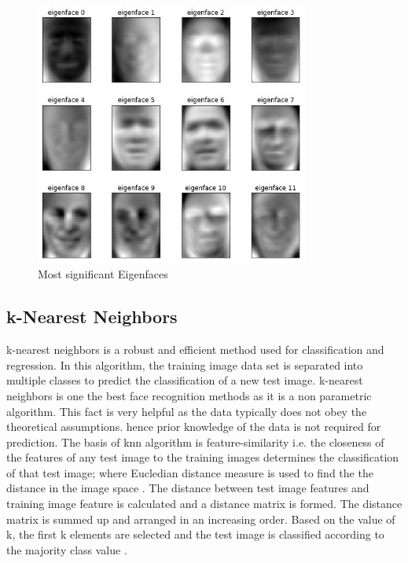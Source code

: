 \documentclass[conference]{IEEEtran}
\begin{document}
\begin{figure}[h!]
 \centering
 \includegraphics[width = 9cm]{eigenface.JPG}
 \caption{ Most significant Eigenfaces}
 \label{fig 1 : eigenface}
\end{figure}
	

\subsection{k-Nearest Neighbors } 
\label{subsec: 1b.Knn}
k-nearest neighbors is a robust and efficient method used for classification and regression. In this algorithm, the training image data set is separated into multiple classes to predict the classification of a new test image. k-nearest neighbors is one the best face recognition methods as it is a non parametric algorithm. This fact is very helpful as the data typically does not obey the theoretical assumptions. hence prior knowledge of the data is not required for prediction. The basis of knn algorithm is feature-similarity  i.e. the closeness of the features of any test image to the training images determines the classification of that test image; where Eucledian distance measure is used to find the the distance in the image space \cite{wang2005euclidean}. The distance between test image features and training image feature is calculated and a distance matrix is formed. The distance matrix is summed up and arranged in an increasing order. Based on the value of k, the first k elements are selected and the test image is classified according to the majority class value \cite{zhang2007ml}.
\end{document}
